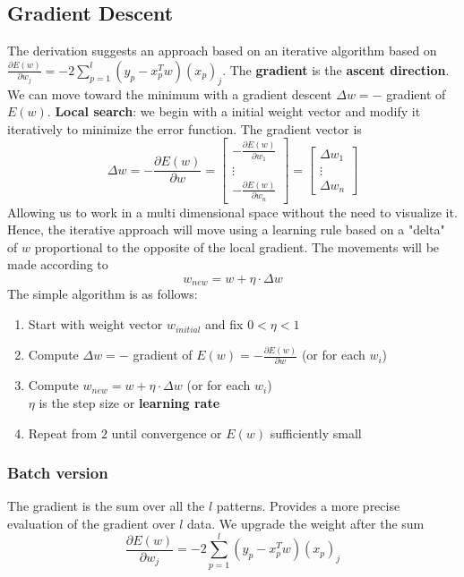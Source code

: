 \documentclass[10pt]{report}
\begin{document}
\subsection{Gradient Descent} The derivation suggests an approach based on an iterative algorithm based on\\$\frac{\partial E(w)}{\partial w_j} = -2 \sum_{p=1}^l (y_p - x_p^T w)(x_p)_j$. The \textbf{gradient} is the \textbf{ascent direction}. We can move toward the minimum with a gradient descent $\Delta w = -$ gradient of $E(w)$. \textbf{Local search}: we begin with a initial weight vector and modify it iteratively to minimize the error function. The gradient vector is
$$\Delta w = -\frac{\partial E(w)}{\partial w} = \left[\begin{array}{c}
-\frac{\partial E(w)}{\partial w_1}\\\vdots\\-\frac{\partial E(w)}{\partial w_n}
\end{array}\right] = \left[\begin{array}{c}
\Delta w_1\\\vdots\\\Delta w_n
\end{array} \right]$$
Allowing us to work in a multi dimensional space without the need to visualize it. Hence, the iterative approach will move using a learning rule based on a "delta" of $w$ proportional to the opposite of the local gradient. The movements will be made according to $$w_{new} = w + \eta\cdot\Delta w$$
The simple algorithm is as follows:
\begin{enumerate}
	\item Start with weight vector $w_{initial}$ and fix $0 < \eta < 1$
	\item Compute $\Delta w = -$ gradient of $E(w) = -\frac{\partial E(w)}{\partial w}$ (or for each $w_i$)
	\item Compute $w_{new} = w + \eta\cdot\Delta w$ (or for each $w_i$)\\
	$\eta$ is the step size or \textbf{learning rate}
	\item Repeat from $2$ until convergence or $E(w)$ sufficiently small
\end{enumerate}
\subsubsection{Batch version} The gradient is the sum over all the $l$ patterns. Provides a more precise evaluation of the gradient over $l$ data. We upgrade the weight after the sum
$$\frac{\partial E(w)}{\partial w_j} = -2 \sum_{p=1}^l (y_p - x_p^T w)(x_p)_j$$
\end{document}
